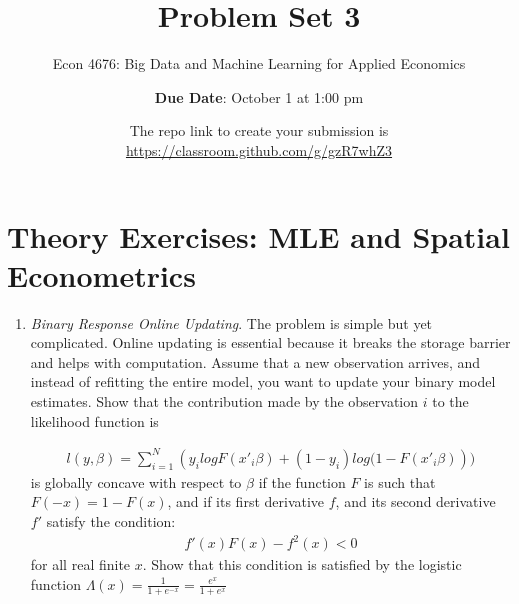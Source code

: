 \documentclass[12pt,onecolumn]{article}
\title{Problem Set 3}
\subtitle{Econ 4676: Big Data and Machine Learning for Applied Economics}
\author{{\bf Due Date}: October 1 at 1:00 pm}
\date{}
\date{The repo link to create your submission is \url{https://classroom.github.com/g/gzR7whZ3}}
\begin{document}
\maketitle

\section{Theory Exercises: MLE and Spatial Econometrics}

\begin{enumerate}
  
  \item {\it Binary Response Online Updating}. The problem is simple but yet complicated. Online updating is essential because it breaks the storage barrier and helps with computation. Assume that a new observation arrives, and instead of refitting the entire model, you want to update your binary model estimates. Show that the contribution made by the observation $i$ to the likelihood function is

\begin{align}
l(y,\beta) = \sum_{i=1}^N \left( y_i log F(x'_i\beta) + (1-y_i) log (1-F(x'_i\beta)  \right))
\end{align}
  is globally concave with respect to $\beta$ if the function $F$ is such that $F(-x)=1-F(x)$, and if its first derivative $f$, and its second derivative $f'$ satisfy the condition:
  \begin{align}
  f'(x)F(x)-f^2(x)<0
  \end{align}
  for all real finite $x$. Show that this condition is satisfied by the logistic function $\Lambda(x)=\frac{1}{1+e^{-x}}=\frac{e^{x}}{1+e^{x}}$


\end{enumerate}
\end{document}
